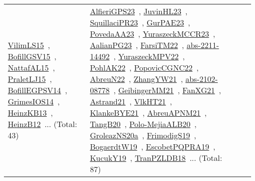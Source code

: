{\begin{longtable}{lp{3cm}>{\raggedright\arraybackslash}p{6cm}>{\raggedright\arraybackslash}p{6cm}>{\raggedright\arraybackslash}p{8cm}}
\href{works/VilimLS15.pdf}{VilimLS15}~\cite{VilimLS15}, \href{works/BofillGSV15.pdf}{BofillGSV15}~\cite{BofillGSV15}, \href{works/NattafAL15.pdf}{NattafAL15}~\cite{NattafAL15}, \href{works/PraletLJ15.pdf}{PraletLJ15}~\cite{PraletLJ15}, \href{works/BofillEGPSV14.pdf}{BofillEGPSV14}~\cite{BofillEGPSV14}, \href{works/GrimesIOS14.pdf}{GrimesIOS14}~\cite{GrimesIOS14}, \href{works/HeinzKB13.pdf}{HeinzKB13}~\cite{HeinzKB13}, \href{works/HeinzB12.pdf}{HeinzB12}~\cite{HeinzB12}... (Total: 43) & \href{works/AlfieriGPS23.pdf}{AlfieriGPS23}~\cite{AlfieriGPS23}, \href{works/JuvinHL23.pdf}{JuvinHL23}~\cite{JuvinHL23}, \href{works/SquillaciPR23.pdf}{SquillaciPR23}~\cite{SquillaciPR23}, \href{works/GurPAE23.pdf}{GurPAE23}~\cite{GurPAE23}, \href{works/PovedaAA23.pdf}{PovedaAA23}~\cite{PovedaAA23}, \href{works/YuraszeckMCCR23.pdf}{YuraszeckMCCR23}~\cite{YuraszeckMCCR23}, \href{works/AalianPG23.pdf}{AalianPG23}~\cite{AalianPG23}, \href{works/FarsiTM22.pdf}{FarsiTM22}~\cite{FarsiTM22}, \href{works/abs-2211-14492.pdf}{abs-2211-14492}~\cite{abs-2211-14492}, \href{works/YuraszeckMPV22.pdf}{YuraszeckMPV22}~\cite{YuraszeckMPV22}, \href{works/PohlAK22.pdf}{PohlAK22}~\cite{PohlAK22}, \href{works/PopovicCGNC22.pdf}{PopovicCGNC22}~\cite{PopovicCGNC22}, \href{works/AbreuN22.pdf}{AbreuN22}~\cite{AbreuN22}, \href{works/ZhangYW21.pdf}{ZhangYW21}~\cite{ZhangYW21}, \href{works/abs-2102-08778.pdf}{abs-2102-08778}~\cite{abs-2102-08778}, \href{works/GeibingerMM21.pdf}{GeibingerMM21}~\cite{GeibingerMM21}, \href{works/FanXG21.pdf}{FanXG21}~\cite{FanXG21}, \href{works/Astrand21.pdf}{Astrand21}~\cite{Astrand21}, \href{works/VlkHT21.pdf}{VlkHT21}~\cite{VlkHT21}, \href{works/KlankeBYE21.pdf}{KlankeBYE21}~\cite{KlankeBYE21}, \href{works/AbreuAPNM21.pdf}{AbreuAPNM21}~\cite{AbreuAPNM21}, \href{works/TangB20.pdf}{TangB20}~\cite{TangB20}, \href{works/Polo-MejiaALB20.pdf}{Polo-MejiaALB20}~\cite{Polo-MejiaALB20}, \href{works/GroleazNS20a.pdf}{GroleazNS20a}~\cite{GroleazNS20a}, \href{works/FrimodigS19.pdf}{FrimodigS19}~\cite{FrimodigS19}, \href{works/BogaerdtW19.pdf}{BogaerdtW19}~\cite{BogaerdtW19}, \href{works/EscobetPQPRA19.pdf}{EscobetPQPRA19}~\cite{EscobetPQPRA19}, \href{works/KucukY19.pdf}{KucukY19}~\cite{KucukY19}, \href{works/TranPZLDB18.pdf}{TranPZLDB18}~\cite{TranPZLDB18}... (Total: 87)\\

\end{longtable}}
